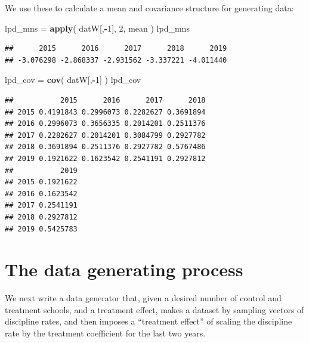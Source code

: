 \documentclass[
]{book}
\newenvironment{Shaded}{\begin{snugshade}}{\end{snugshade}}
\newcommand{\DecValTok}[1]{\textcolor[rgb]{0.00,0.00,0.81}{#1}}
\newcommand{\FunctionTok}[1]{\textcolor[rgb]{0.13,0.29,0.53}{\textbf{#1}}}
\newcommand{\NormalTok}[1]{#1}
\newcommand{\OtherTok}[1]{\textcolor[rgb]{0.56,0.35,0.01}{#1}}
\newcommand{\SpecialCharTok}[1]{\textcolor[rgb]{0.81,0.36,0.00}{\textbf{#1}}}
\begin{document}
We use these to calculate a mean and covariance structure for generating data:

\begin{Shaded}
\begin{Highlighting}[]
\NormalTok{lpd\_mns }\OtherTok{=} \FunctionTok{apply}\NormalTok{( datW[,}\SpecialCharTok{{-}}\DecValTok{1}\NormalTok{], }\DecValTok{2}\NormalTok{, mean )}
\NormalTok{lpd\_mns}
\end{Highlighting}
\end{Shaded}

\begin{verbatim}
##      2015      2016      2017      2018      2019 
## -3.076298 -2.868337 -2.931562 -3.337221 -4.011440
\end{verbatim}

\begin{Shaded}
\begin{Highlighting}[]
\NormalTok{lpd\_cov }\OtherTok{=} \FunctionTok{cov}\NormalTok{( datW[,}\SpecialCharTok{{-}}\DecValTok{1}\NormalTok{] )}
\NormalTok{lpd\_cov}
\end{Highlighting}
\end{Shaded}

\begin{verbatim}
##           2015      2016      2017      2018
## 2015 0.4191843 0.2996073 0.2282627 0.3691894
## 2016 0.2996073 0.3656335 0.2014201 0.2511376
## 2017 0.2282627 0.2014201 0.3084799 0.2927782
## 2018 0.3691894 0.2511376 0.2927782 0.5767486
## 2019 0.1921622 0.1623542 0.2541191 0.2927812
##           2019
## 2015 0.1921622
## 2016 0.1623542
## 2017 0.2541191
## 2018 0.2927812
## 2019 0.5425783
\end{verbatim}

\section{The data generating process}\label{the-data-generating-process}

We next write a data generator that, given a desired number of control and treatment schools, and a treatment effect, makes a dataset by sampling vectors of discipline rates, and then imposes a ``treatment effect'' of scaling the discipline rate by the treatment coefficient for the last two years.
\end{document}

